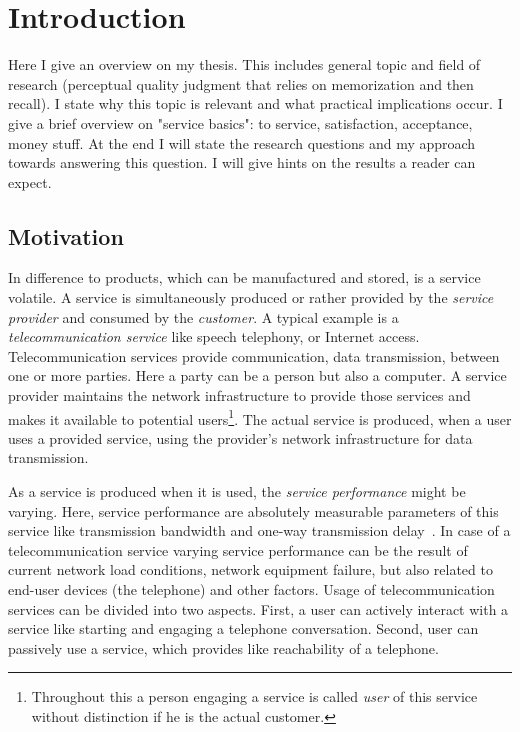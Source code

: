 \chapter{Introduction}\label{chap:01}
\begin{chapter-abstract}
Here I give an overview on my thesis.
This includes general topic and field of research (perceptual quality judgment that relies on memorization and then recall).
I state why this topic is relevant and what practical implications occur.
I give a brief overview on "service basics": to service, satisfaction, acceptance, money stuff.
At the end I will state the research questions and my approach towards answering this question.
I will give hints on the results a reader can expect.
\end{chapter-abstract}


\section{Motivation}
In difference to products, which can be manufactured and stored, is a service volatile.
A service is simultaneously produced or rather provided by the \emph{service provider} and consumed by the \emph{customer}.
A typical example is a \emph{telecommunication service} like speech telephony, or Internet access.
Telecommunication services provide communication, \ie data transmission, between one or more parties.
Here a party can be a person but also a computer.
A service provider maintains the network infrastructure to provide those services and makes it available to potential users\footnote{Throughout this a person engaging a service is called \emph{user} of this service without distinction if he is the actual customer.}.
The actual service is produced, when a user uses a provided service, using the provider's network infrastructure for data transmission.

As a service is produced when it is used, the \emph{service performance} might be varying.
Here, service performance are absolutely measurable parameters of this service like transmission bandwidth and one-way transmission delay~\citep[cf.][p. 12]{moller_assessment_2000}.
In case of a telecommunication service varying service performance can be the result of current network load conditions, network equipment failure, but also related to end-user devices (\eg the telephone) and other factors.
Usage of telecommunication services can be divided into two aspects.
First, a user can actively interact with a service like starting and engaging a telephone conversation.
Second, user can passively use a service, which provides like reachability of a telephone.

